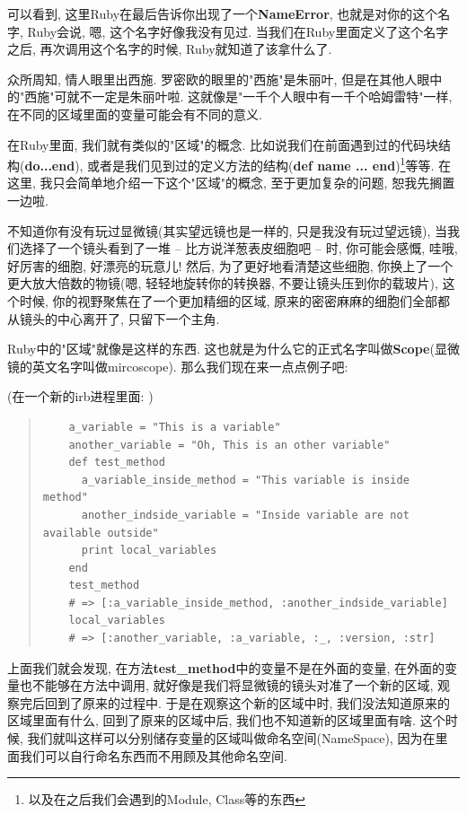可以看到, 这里Ruby在最后告诉你出现了一个\textbf{NameError}, 也就是对你的这个名字, Ruby会说, 嗯, 这个名字好像我没有见过. 当我们在Ruby里面定义了这个名字之后, 再次调用这个名字的时候, Ruby就知道了该拿什么了. 

众所周知, 情人眼里出西施. 罗密欧的眼里的"西施"是朱丽叶, 但是在其他人眼中的"西施"可就不一定是朱丽叶啦. 这就像是"一千个人眼中有一千个哈姆雷特"一样, 在不同的区域里面的变量可能会有不同的意义. 

在Ruby里面, 我们就有类似的"区域"的概念. 比如说我们在前面遇到过的代码块结构(\textbf{do...end}), 或者是我们见到过的定义方法的结构(\textbf{def name ... end})\footnote{以及在之后我们会遇到的Module, Class等的东西}等等. 在这里, 我只会简单地介绍一下这个"区域"的概念, 至于更加复杂的问题, 恕我先搁置一边啦. 

不知道你有没有玩过显微镜(其实望远镜也是一样的, 只是我没有玩过望远镜), 当我们选择了一个镜头看到了一堆 -- 比方说洋葱表皮细胞吧 -- 时, 你可能会感慨, 哇哦, 好厉害的细胞, 好漂亮的玩意儿! 然后, 为了更好地看清楚这些细胞, 你换上了一个更大放大倍数的物镜(嗯, 轻轻地旋转你的转换器, 不要让镜头压到你的载玻片), 这个时候, 你的视野聚焦在了一个更加精细的区域, 原来的密密麻麻的细胞们全部都从镜头的中心离开了, 只留下一个主角. 

Ruby中的"区域"就像是这样的东西. 这也就是为什么它的正式名字叫做\textbf{Scope}(显微镜的英文名字叫做mircoscope). 那么我们现在来一点点例子吧: 

(在一个新的irb进程里面: )

\begin{quotation}
  \begin{verbatim}
    a_variable = "This is a variable"
    another_variable = "Oh, This is an other variable"
    def test_method
      a_variable_inside_method = "This variable is inside method"
      another_indside_variable = "Inside variable are not available outside"
      print local_variables
    end
    test_method
    # => [:a_variable_inside_method, :another_indside_variable]
    local_variables
    # => [:another_variable, :a_variable, :_, :version, :str]
  \end{verbatim}
\end{quotation}

上面我们就会发现, 在方法\textbf{test\_method}中的变量不是在外面的变量, 在外面的变量也不能够在方法中调用, 就好像是我们将显微镜的镜头对准了一个新的区域, 观察完后回到了原来的过程中. 于是在观察这个新的区域中时, 我们没法知道原来的区域里面有什么, 回到了原来的区域中后, 我们也不知道新的区域里面有啥. 这个时候, 我们就叫这样可以分别储存变量的区域叫做命名空间(NameSpace), 因为在里面我们可以自行命名东西而不用顾及其他命名空间. 

